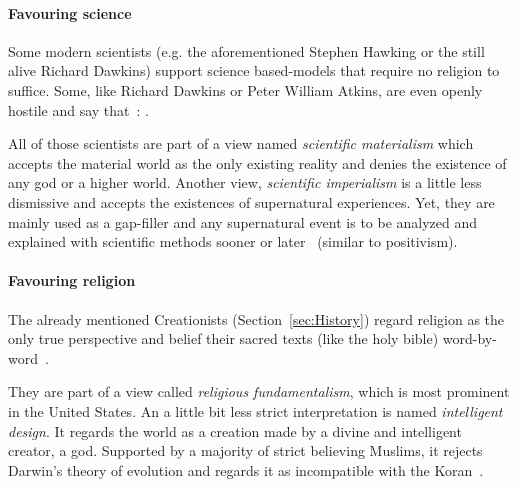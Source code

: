 
\paragraph{Favouring science}
Some modern scientists (e.g. the aforementioned Stephen Hawking or the still alive Richard Dawkins) support science based-models that require no religion to suffice.
Some, like Richard Dawkins or Peter William Atkins, are even openly hostile and say that~\cite{dawkins2006god}: .

All of those scientists are part of a view named \emph{scientific materialism} which accepts the material world as the only existing reality and denies the existence of any god or a higher world.
Another view, \emph{scientific imperialism} is a little less dismissive and accepts the existences of supernatural experiences.
Yet, they are mainly used as a gap-filler and any supernatural event is to be analyzed and explained with scientific methods sooner or later~\cite{krishna1971gopi} (similar to positivism). %


\paragraph{Favouring religion}
The already mentioned Creationists (Section~\ref{sec:History}) regard religion as the only true perspective and belief their sacred texts (like the holy bible) word-by-word~\cite{Hameed1637}.

They are part of a view called \emph{religious fundamentalism}, which is most prominent in the United States.
An a little bit less strict interpretation is named \emph{intelligent design}. It regards the world as a creation made by a divine and intelligent creator, a god.
Supported by a majority of strict believing Muslims, it rejects Darwin's theory of evolution and regards it as incompatible with the Koran~\cite{Demirci2016}.


